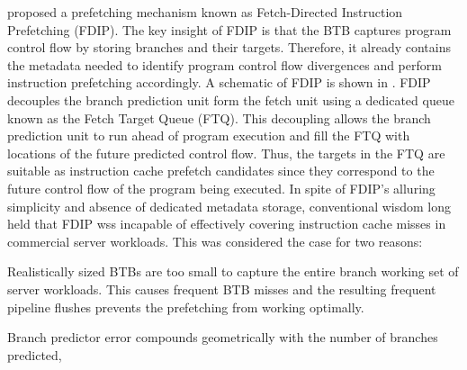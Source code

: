 \documentclass[../main.tex]{subfiles}
\begin{document}
\begin{refsection}
\textcite{reinman99_fetch_direc_instr_prefet} proposed a prefetching
mechanism known as Fetch-Directed Instruction Prefetching (FDIP). The
key insight of FDIP is that the BTB captures program control flow by
storing branches and their targets. Therefore, it already contains the
metadata needed to identify program control flow divergences and
perform instruction prefetching accordingly. A schematic of FDIP is
shown in . FDIP decouples the branch prediction unit
form the fetch unit using a dedicated queue known as the Fetch Target
Queue (FTQ). This decoupling allows the branch prediction unit to run
ahead of program execution and fill the FTQ with locations of the
future predicted control flow. Thus, the targets in the FTQ are
suitable as instruction cache prefetch candidates since they
correspond to the future control flow of the program being
executed. In spite of FDIP's alluring simplicity and absence of
dedicated metadata storage, conventional wisdom long held that FDIP
wss incapable of effectively covering instruction cache misses in
commercial server workloads. This was considered the case for two
reasons: \begin{inparaenum}[1)] \item Realistically sized BTBs are too
  small to capture the entire branch working set of server
  workloads. This causes frequent BTB misses and the resulting
  frequent pipeline flushes prevents the prefetching from working
  optimally. \item Branch predictor error compounds geometrically with
  the number of branches predicted, 
\end{inparaenum}



\end{refsection}
\end{document}
